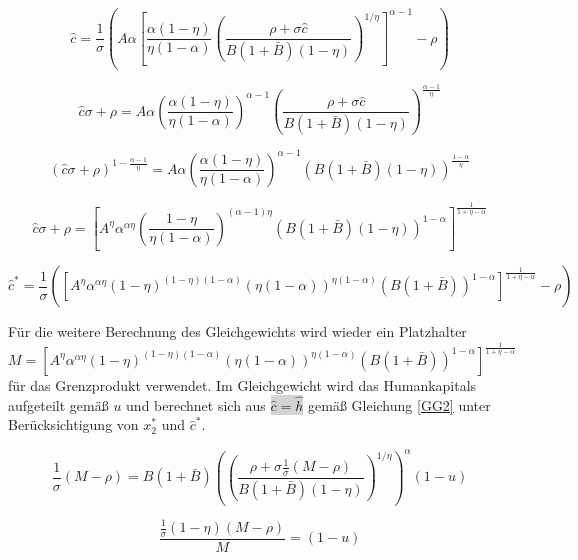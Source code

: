 	\begin{equation}
		\hat{c}=\frac{1}{\sigma}\left(A\alpha \left[\frac{\alpha(1-\eta)}{\eta(1-\alpha)}\left(\frac{\rho+\sigma\hat{c}}{B(1+\bar{B})(1-\eta)}\right)^{1/\eta}\right]^{\alpha-1}-\rho\right)
	\end{equation}


	\begin{equation*}
		\hat{c}\sigma+\rho=A\alpha\left(\frac{\alpha(1-\eta)}{\eta(1-\alpha)}\right)^{\alpha-1}\left(\frac{\rho+\sigma\hat{c}}{B(1+\bar{B})(1-\eta)}\right)^{\frac{\alpha-1}{\eta}}
	\end{equation*}


	\begin{equation*}
		(\hat{c}\sigma+\rho)^{1-\frac{\alpha-1}{\eta}}=A\alpha\left(\frac{\alpha(1-\eta)}{\eta(1-\alpha)}\right)^{\alpha-1}\left(B(1+\bar{B})(1-\eta)\right)^{\frac{1-\alpha}{\eta}}
	\end{equation*}


	\begin{equation*}
		\hat{c}\sigma+\rho=\left[A^\eta\alpha^{\alpha\eta}\left(\frac{1-\eta}{\eta(1-\alpha)}\right)^{(\alpha-1)\eta}\left(B(1+\bar{B})(1-\eta)\right)^{1-\alpha}\right]^\frac{1}{1+\eta-\alpha}
	\end{equation*}


	\begin{equation}
		\boxed{\hat{c}^*=\frac{1}{\sigma}\left(\left[A^\eta\alpha^{\alpha\eta}(1-\eta)^{(1-\eta)(1-\alpha)}(\eta(1-\alpha))^{\eta(1-\alpha)}(B(1+\bar{B}))^{1-\alpha}\right]^\frac{1}{1+\eta-\alpha}-\rho\right)}
	\end{equation}


Für die weitere Berechnung des Gleichgewichts wird wieder ein Platzhalter $M=\left[A^\eta\alpha^{\alpha\eta}(1-\eta)^{(1-\eta)(1-\alpha)}(\eta(1-\alpha))^{\eta(1-\alpha)}(B(1+\bar{B}))^{1-\alpha}\right]^\frac{1}{1+\eta-\alpha}$ für das Grenzprodukt verwendet.
Im Gleichgewicht wird das Humankapitals aufgeteilt gemä{\ss} $u$ und berechnet sich aus \colorbox{lightgray}{$\hat{c}=\hat{h}$} gemä{\ss} Gleichung \eqref{GG2} unter Berücksichtigung von $x_2^*$ und $\hat{c}^*$. 


	\begin{equation}
		\frac{1}{\sigma} (M-\rho)=B(1+\bar{B})\left(\left(\frac{\rho+\sigma\frac{1}{\sigma}(M-\rho)}{B(1+\bar{B})(1-\eta)}\right)^{1/\eta}\right)^\alpha(1-u)
	\end{equation}


	\begin{equation*}
		\frac{\frac{1}{\sigma}(1-\eta)(M-\rho)}{M}=(1-u)
	\end{equation*}


